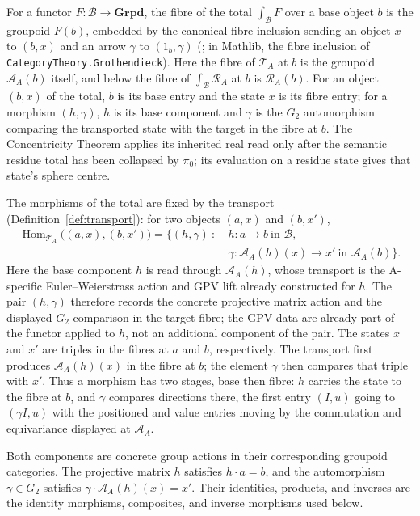 \documentclass[11pt]{article}
\theoremstyle{plain}
\theoremstyle{definition}
\theoremstyle{remark}
\begin{document}
For a functor $F:\mathcal B\to\mathbf{Grpd}$, the fibre of the total
$\int_{\mathcal B}F$ over a base object $b$ is the groupoid $F(b)$,
embedded by the canonical fibre inclusion sending an object $x$ to $(b,x)$
and an arrow $\gamma$ to $(1_b,\gamma)$
\textup{(}\cite[\S8.3]{Riehl}; in Mathlib, the fibre inclusion of
\texttt{CategoryTheory.Grothendieck}\textup{)}.  Here the fibre of
$\mathcal T_A$ at $b$ is the groupoid $\mathcal A_A(b)$ itself, and below
the fibre of $\int_{\mathcal B}\mathcal R_A$ at $b$ is
$\mathcal R_A(b)$.  For an object $(b,x)$ of the total, $b$ is its
base entry and the state $x$ is its fibre entry; for a morphism
$(h,\gamma)$, $h$ is its base component and $\gamma$ is the $G_2$
automorphism comparing the transported state with the target in the fibre
at $b$. The Concentricity Theorem applies its inherited real read only after
the semantic residue total has been collapsed by $\pi_0$; its evaluation
on a residue state gives that state's sphere centre.

The morphisms of the total are fixed by the transport
(Definition~\ref{def:transport}): for two objects $(a,x)$ and
$(b,x')$,
\[
\begin{aligned}
  \operatorname{Hom}_{\mathcal T_A}\bigl((a,x),(b,x')\bigr)
  =\bigl\{(h,\gamma)\ :\ &h:a\to b\ \text{in }\mathcal B,\\
  &\gamma:\mathcal A_A(h)(x)\to x'\ \text{in }\mathcal A_A(b)\bigr\}.
\end{aligned}
\]
Here the base component $h$ is read through $\mathcal A_A(h)$, whose
transport is the A-specific Euler--Weierstrass action and GPV lift already
constructed for $h$.  The pair $(h,\gamma)$ therefore records the
concrete projective matrix action and the displayed $G_2$ comparison in the
target fibre; the GPV data are already part of the functor applied to $h$,
not an additional component of the pair.  The states $x$ and $x'$ are
triples in the fibres at $a$ and $b$, respectively.  The transport first produces
$\mathcal A_A(h)(x)$ in the fibre at $b$; the element $\gamma$ then compares
that triple with $x'$.  Thus a morphism has two stages, base then fibre:
$h$ carries the state to the fibre at
$b$, and $\gamma$ compares directions there, the first entry $(I,u)$
going to $(\gamma I,u)$ with the positioned and value entries moving by
the commutation and equivariance displayed at $\mathcal A_A$.

Both components are concrete group actions in their corresponding
groupoid categories.  The projective matrix $h$ satisfies $h\cdot a=b$,
and the automorphism $\gamma\in G_2$ satisfies
$\gamma\cdot\mathcal A_A(h)(x)=x'$.  Their identities, products,
and inverses are the identity morphisms, composites, and inverse
morphisms used below.
\end{document}
